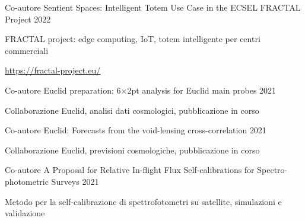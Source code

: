 


\begin{cventries}


\cventry
{Co-autore} %
{Sentient Spaces: Intelligent Totem Use Case in the ECSEL FRACTAL Project} %
{2022} %
{ %
\begin{cvitems}
\item {FRACTAL project: edge computing, IoT, totem intelligente per centri commerciali}
\item {\url{https://fractal-project.eu/}}
\end{cvitems}
}


\cventry
{Co-autore} %
{Euclid preparation: 6×2pt analysis for Euclid main probes} %
{2021} %
{ %
\begin{cvitems}
\item {Collaborazione Euclid, analisi dati cosmologici, pubblicazione in corso}
\end{cvitems}
}


\cventry
{Co-autore} %
{Euclid: Forecasts from the void-lensing cross-correlation} %
{2021} %
{ %
\begin{cvitems}
\item {Collaborazione Euclid, previsioni cosmologiche, pubblicazione in corso}
\end{cvitems}
}


\cventry
{Co-autore} %
{A Proposal for Relative In-flight Flux Self-calibrations for Spectro-photometric Surveys} %
{2021} %
{ %
\begin{cvitems}
\item {Metodo per la self-calibrazione di spettrofotometri su satellite, simulazioni e validazione}
\end{cvitems}
}


\end{cventries}